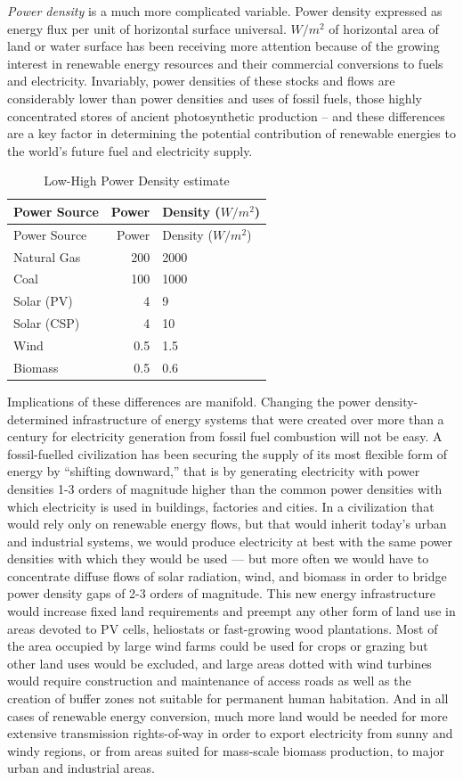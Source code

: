 \documentclass[
]{book}
\begin{document}
\emph{Power density} is a much more complicated variable.
Power density expressed as energy flux per unit of horizontal surface universal.
\(W/m^{2}\) of horizontal area of land or water
surface has been receiving more attention because of the growing interest
in renewable energy resources and their commercial conversions to fuels and electricity.
Invariably, power densities of these stocks
and flows are considerably lower than power densities and uses of fossil fuels, those highly
concentrated stores of ancient photosynthetic production -- and these differences are a key factor
in determining the potential contribution of renewable energies to the world's future fuel and
electricity supply.

\begin{longtable}[]{@{}lrl@{}}
\caption{Low-High Power Density estimate}\tabularnewline
\toprule
Power Source & Power & Density (\(W/m^{2}\))\tabularnewline
\midrule
\endfirsthead
\toprule
Power Source & Power & Density (\(W/m^{2}\))\tabularnewline
\midrule
\endhead
Natural Gas & 200 & 2000\tabularnewline
Coal & 100 & 1000\tabularnewline
Solar (PV) & 4 & 9\tabularnewline
Solar (CSP) & 4 & 10\tabularnewline
Wind & 0.5 & 1.5\tabularnewline
Biomass & 0.5 & 0.6\tabularnewline
\bottomrule
\end{longtable}

Implications of these differences are manifold. Changing the power density-determined
infrastructure of energy systems that were created over more than a century for electricity
generation from fossil fuel combustion will not be easy. A fossil-fuelled civilization has been
securing the supply of its most flexible form of energy by ``shifting downward,'' that is by
generating electricity with power densities 1-3 orders of magnitude higher than the common
power densities with which electricity is used in buildings, factories and cities. In a civilization
that would rely only on renewable energy flows, but that would inherit today's urban and
industrial systems, we would produce electricity at best with the same power densities with
which they would be used --- but more often we would have to concentrate diffuse flows of solar
radiation, wind, and biomass in order to bridge power density gaps of 2-3 orders of magnitude.
This new energy infrastructure would increase fixed land requirements and preempt any other
form of land use in areas devoted to PV cells, heliostats or fast-growing wood plantations. Most
of the area occupied by large wind farms could be used for crops or grazing but other land uses
would be excluded, and large areas dotted with wind turbines would require construction and
maintenance of access roads as well as the creation of buffer zones not suitable for permanent
human habitation. And in all cases of renewable energy conversion, much more land would be
needed for more extensive transmission rights-of-way in order to export electricity from sunny
and windy regions, or from areas suited for mass-scale biomass production, to major urban and
industrial areas.
\end{document}
